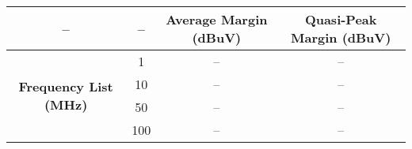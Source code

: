 \begin{tabular}{|c|c|c|c|}
\hline
-- & -- & \textbf{Average Margin (dBuV)} & \textbf{Quasi-Peak Margin (dBuV)} \\
\hline
\multirow{4}{*}{\textbf{Frequency List (MHz)}} & 1 & -- & -- \\
 & 10 & -- & -- \\
 & 50 & -- & -- \\
 & 100 & -- & -- \\
\hline
\end{tabular}